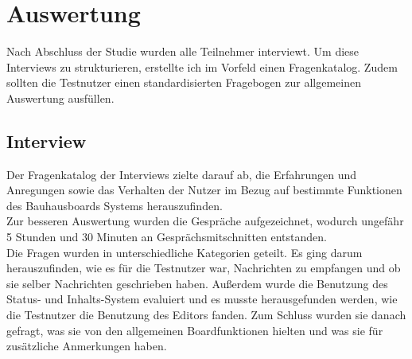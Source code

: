 \section{Auswertung}\label{Auswertung}
Nach Abschluss der Studie wurden alle Teilnehmer interviewt.
Um diese Interviews zu strukturieren, erstellte ich im Vorfeld einen Fragenkatalog.
Zudem sollten die Testnutzer einen standardisierten Fragebogen zur allgemeinen Auswertung ausfüllen.
\subsection{Interview}\label{Interviews}
Der Fragenkatalog der Interviews zielte darauf ab, die Erfahrungen und Anregungen sowie das Verhalten der Nutzer im Bezug auf bestimmte Funktionen des Bauhausboards Systems herauszufinden.
\\
Zur besseren Auswertung wurden die Gespräche aufgezeichnet, wodurch ungefähr 5 Stunden und 30 Minuten an Gesprächsmitschnitten entstanden. 
\\
Die Fragen wurden in unterschiedliche Kategorien geteilt.
Es ging darum herauszufinden, wie es für die Testnutzer war, Nachrichten zu empfangen und ob sie selber Nachrichten geschrieben haben.
Außerdem wurde die Benutzung des Status- und Inhalts-System evaluiert und es musste herausgefunden werden, wie die Testnutzer die Benutzung des Editors fanden.
Zum Schluss wurden sie danach gefragt, was sie von den allgemeinen Boardfunktionen hielten und was sie für zusätzliche Anmerkungen haben.
